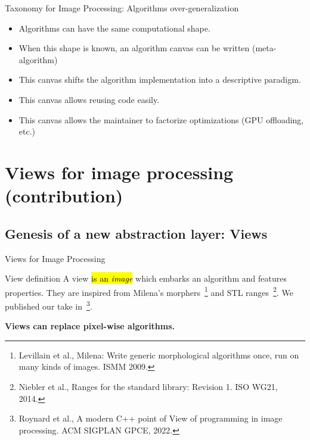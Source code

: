 \documentclass[12pt,aspectratio=169]{beamer}
\makeatletter
\let\HL\hl
\renewcommand\hl{%
  \let\set@color\beamerorig@set@color
  \let\reset@color\beamerorig@reset@color
  \HL}
\makeatother
\begin{document}
\begin{frame}[fragile]{Taxonomy for Image Processing: Algorithms over-generalization}
  \begin{itemize}
    \item Algorithms can have the same computational shape.
    \item When this shape is known, an algorithm canvas can be written (meta-algorithm)
    \item This canvas shifts the algorithm implementation into a descriptive paradigm.
    \item This canvas allows reusing code easily.
    \item This canvas allows the maintainer to factorize optimizations (GPU offloading, etc.)
  \end{itemize}
\end{frame}

%
%
%
\section[Views for image processing (contribution)]{Views for image processing (contribution)}

\subsection{Genesis of a new abstraction layer: Views}

\begin{frame}[fragile]{Views for Image Processing}
  \begin{alertblock}{View definition}
    A view \hl{is an \emph{image}} which embarks an algorithm and features properties. They are inspired from Milena's
    morphers~\footnote{Levillain et al., Milena: Write generic morphological algorithms once, run on many kinds of
      images. ISMM 2009.} and STL ranges~\footnote{Niebler et al., Ranges for the standard library: Revision 1. ISO WG21,
      2014.}. We published our take in~\footnote{Roynard et al., A modern C++ point of View of programming in image
      processing. ACM SIGPLAN GPCE, 2022.}.

  \end{alertblock}
  \begin{center}\textbf{Views can replace pixel-wise algorithms.}\end{center}
\end{frame}
\end{document}
